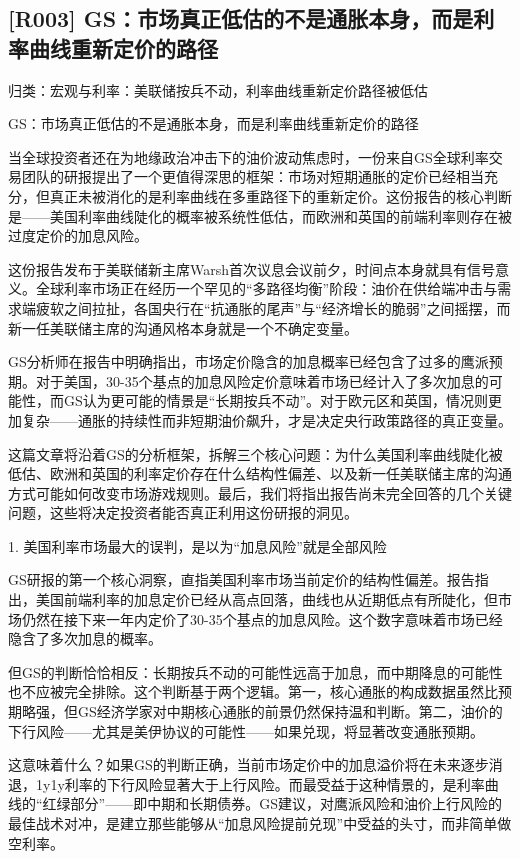 \documentclass[11pt]{ctexart}
\begin{document}
\subsection{[R003] GS：市场真正低估的不是通胀本身，而是利率曲线重新定价的路径}
{\small\color{refgray}归类：宏观与利率：美联储按兵不动，利率曲线重新定价路径被低估}

GS：市场真正低估的不是通胀本身，而是利率曲线重新定价的路径

当全球投资者还在为地缘政治冲击下的油价波动焦虑时，一份来自GS全球利率交易团队的研报提出了一个更值得深思的框架：市场对短期通胀的定价已经相当充分，但真正未被消化的是利率曲线在多重路径下的重新定价。这份报告的核心判断是——美国利率曲线陡化的概率被系统性低估，而欧洲和英国的前端利率则存在被过度定价的加息风险。

这份报告发布于美联储新主席Warsh首次议息会议前夕，时间点本身就具有信号意义。全球利率市场正在经历一个罕见的“多路径均衡”阶段：油价在供给端冲击与需求端疲软之间拉扯，各国央行在“抗通胀的尾声”与“经济增长的脆弱”之间摇摆，而新一任美联储主席的沟通风格本身就是一个不确定变量。

GS分析师在报告中明确指出，市场定价隐含的加息概率已经包含了过多的鹰派预期。对于美国，30-35个基点的加息风险定价意味着市场已经计入了多次加息的可能性，而GS认为更可能的情景是“长期按兵不动”。对于欧元区和英国，情况则更加复杂——通胀的持续性而非短期油价飙升，才是决定央行政策路径的真正变量。

这篇文章将沿着GS的分析框架，拆解三个核心问题：为什么美国利率曲线陡化被低估、欧洲和英国的利率定价存在什么结构性偏差、以及新一任美联储主席的沟通方式可能如何改变市场游戏规则。最后，我们将指出报告尚未完全回答的几个关键问题，这些将决定投资者能否真正利用这份研报的洞见。

1. 美国利率市场最大的误判，是以为“加息风险”就是全部风险

GS研报的第一个核心洞察，直指美国利率市场当前定价的结构性偏差。报告指出，美国前端利率的加息定价已经从高点回落，曲线也从近期低点有所陡化，但市场仍然在接下来一年内定价了30-35个基点的加息风险。这个数字意味着市场已经隐含了多次加息的概率。

但GS的判断恰恰相反：长期按兵不动的可能性远高于加息，而中期降息的可能性也不应被完全排除。这个判断基于两个逻辑。第一，核心通胀的构成数据虽然比预期略强，但GS经济学家对中期核心通胀的前景仍然保持温和判断。第二，油价的下行风险——尤其是美伊协议的可能性——如果兑现，将显著改变通胀预期。

这意味着什么？如果GS的判断正确，当前市场定价中的加息溢价将在未来逐步消退，1y1y利率的下行风险显著大于上行风险。而最受益于这种情景的，是利率曲线的“红绿部分”——即中期和长期债券。GS建议，对鹰派风险和油价上行风险的最佳战术对冲，是建立那些能够从“加息风险提前兑现”中受益的头寸，而非简单做空利率。
\end{document}
